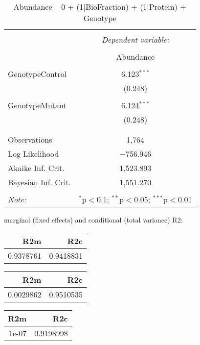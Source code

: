 \documentclass[11pt]{report}
\begin{document}
\begin{table}[!htbp] \centering 
  \caption{Abundance ~ 0 + (1|BioFraction) + (1|Protein) + Genotype} 
  \label{} 
\begin{tabular}{@{\extracolsep{5pt}}lc} 
\\[-1.8ex]\hline 
\hline \\[-1.8ex] 
 & \multicolumn{1}{c}{\textit{Dependent variable:}} \\ 
\cline{2-2} 
\\[-1.8ex] & Abundance \\ 
\hline \\[-1.8ex] 
 GenotypeControl & 6.123$^{***}$ \\ 
  & (0.248) \\ 
  & \\ 
 GenotypeMutant & 6.124$^{***}$ \\ 
  & (0.248) \\ 
  & \\ 
\hline \\[-1.8ex] 
Observations & 1,764 \\ 
Log Likelihood & $-$756.946 \\ 
Akaike Inf. Crit. & 1,523.893 \\ 
Bayesian Inf. Crit. & 1,551.270 \\ 
\hline 
\hline \\[-1.8ex] 
\textit{Note:}  & \multicolumn{1}{r}{$^{*}$p$<$0.1; $^{**}$p$<$0.05; $^{***}$p$<$0.01} \\ 
\end{tabular} 
\end{table} 
marginal (fixed effects) and conditional (total variance) R2:

\begin{tabular}{r|r}
\hline
R2m & R2c\\
\hline
0.9378761 & 0.9418831\\
\hline
\end{tabular}

\begin{tabular}{r|r}
\hline
R2m & R2c\\
\hline
0.0029862 & 0.9510535\\
\hline
\end{tabular}

\begin{tabular}{r|r}
\hline
R2m & R2c\\
\hline
1e-07 & 0.9198998\\
\hline
\end{tabular}
\end{document}
